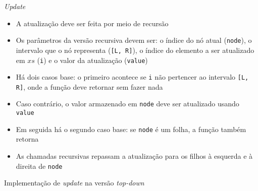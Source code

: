 \begin{frame}[fragile]{\it Update}

    \begin{itemize}
        \item A atualização deve ser feita por meio de recursão

        \item Os parâmetros da versão recursiva devem ser: o índice do nó atual (\texttt{node}),
            o intervalo que o nó representa (\texttt{[L, R]}), o índice do elemento a ser 
            atualizado em $xs$ (\texttt{i}) e o valor da atualização (\texttt{value})

        \item Há dois casos base: o primeiro acontece se \texttt{i} não pertencer ao intervalo 
            \texttt{[L, R]}, onde a função deve retornar sem fazer nada

        \item Caso contrário, o valor armazenado em \texttt{node} deve ser atualizado usando
            \texttt{value}

        \item Em seguida há o segundo caso base: se \texttt{node} é um folha, a função
            também retorna

        \item As chamadas recursivas repassam a atualização para os filhos à esquerda e à direita
            de \texttt{node}

    \end{itemize}

\end{frame}



\begin{frame}[fragile]{Implementação de {\it update} na versão {\it top-down}}
\end{frame}

